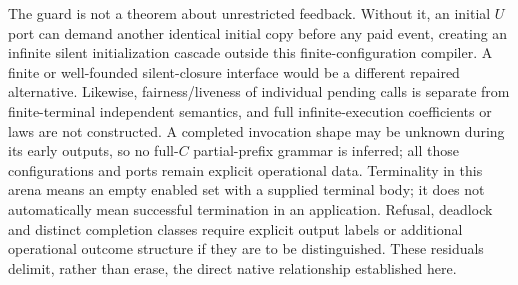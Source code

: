 \documentclass[11pt]{article}
\begin{document}
The guard is not a theorem about unrestricted feedback. Without it, an initial $U$ port can demand another identical initial copy before any paid event, creating an infinite silent initialization cascade outside this finite-configuration compiler. A finite or well-founded silent-closure interface would be a different repaired alternative. Likewise, fairness/liveness of individual pending calls is separate from finite-terminal independent semantics, and full infinite-execution coefficients or laws are not constructed. A completed invocation shape may be unknown during its early outputs, so no full-$C$ partial-prefix grammar is inferred; all those configurations and ports remain explicit operational data. Terminality in this arena means an empty enabled set with a supplied terminal body; it does not automatically mean successful termination in an application. Refusal, deadlock and distinct completion classes require explicit output labels or additional operational outcome structure if they are to be distinguished. These residuals delimit, rather than erase, the direct native relationship established here.
\end{document}

